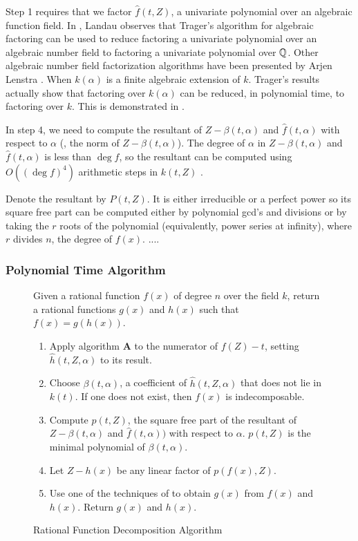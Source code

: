 Step 1 requires that we factor $\hat{f}(t, Z)$, a univariate
polynomial over an algebraic function field.  In \cite{Landau85a},
Landau observes that Trager's algorithm for algebraic factoring
\cite{Trager76a} can be used to reduce factoring a univariate
polynomial over an algebraic number field to factoring a univariate
polynomial over $\mathbb{Q}$.  Other algebraic number field factorization
algorithms have been presented by Arjen Lenstra
\cite{LenstraAK83b,LenstraAK87}.  When $k(\alpha)$ is a finite
algebraic extension of $k$.  Trager's results actually show that
factoring over $k(\alpha)$ can be reduced, in polynomial time, to
factoring over $k$.  This is demonstrated in
.

In step 4, we need to compute the resultant of $Z - \beta(t, \alpha)$
and $\hat{f}(t, \alpha)$ with respect to $\alpha$ (\ie, the norm of $Z
-\beta(t, \alpha)$).  The degree of $\alpha$ in $Z - \beta(t, \alpha)$
and $\hat{f}(t, \alpha)$ is less than $\deg f$, so the resultant can
be computed using $O((\deg f)^4)$ arithmetic steps in $k(t, Z)$
\cite{Brown78}. 

Denote the resultant by $P(t, Z)$.  It is either irreducible or a
perfect power so its square free part can be computed either by
polynomial gcd's and divisions or by taking the $r$\th{} roots of the
polynomial (equivalently, power series at infinity), where $r$ divides
$n$, the degree of $f(x)$. ....


\subsubsection{Polynomial Time Algorithm}
\label{Poly:Time:Sec}

\begin{figure}
\small
{} Given a rational function $f(x)$ of degree $n$
over the field $k$, return a rational functions $g(x)$ and $h(x)$ such that
$f(x) = g(h(x))$. 
\begin{enumerate}
\item Apply algorithm {\bf A} to the numerator of $f(Z) - t$, setting 
$\hat{h}(t, Z, \alpha)$ to its result.
\item Choose $\beta(t, \alpha)$, a coefficient of $\hat{h}(t, Z, \alpha)$ that
does not lie in $k(t)$.  If one does not exist, then $f(x)$ is
indecomposable.
\item Compute $p(t, Z)$, the square free part of the resultant of $Z -
\beta(t, \alpha)$ and $\hat{f}(t, \alpha))$ with respect to $\alpha$.
$p(t, Z)$ is the minimal polynomial of $\beta(t, \alpha)$.
\item Let $Z - h(x)$ be any linear factor of $p(f(x), Z)$.
\item Use one of the techniques of  to obtain
$g(x)$ from $f(x)$ and $h(x)$.  Return $g(x)$ and $h(x)$. 
\end{enumerate}
\caption{Rational Function Decomposition Algorithm\label{Alg:D:Fig}}
\end{figure}

